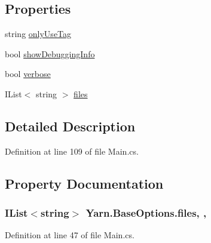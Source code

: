 \subsection*{Properties}
\begin{DoxyCompactItemize}
\item 
string \hyperlink{a00097_a8b30c1b7fb1b74eae455a568c1024b3d}{only\-Use\-Tag}
\item 
bool \hyperlink{a00031_a89964ea17bd19caf00cb5bff563ed01c}{show\-Debugging\-Info}
\item 
bool \hyperlink{a00031_ada4d83d1756918f362d55f6649b82b17}{verbose}
\item 
I\-List$<$ string $>$ \hyperlink{a00031_aa93cbb1bc1d5328e0a417012621e92d2}{files}
\end{DoxyCompactItemize}


\subsection{Detailed Description}


Definition at line 109 of file Main.\-cs.



\subsection{Property Documentation}
\hypertarget{a00031_aa93cbb1bc1d5328e0a417012621e92d2}{
\subsubsection[{files}]{\setlength{\rightskip}{0pt plus 5cm}I\-List$<$string$>$ Yarn.\-Base\-Options.\-files\hspace{0.3cm}{\ttfamily [get]}, {\ttfamily [set]}, {\ttfamily [inherited]}}}\label{a00031_aa93cbb1bc1d5328e0a417012621e92d2}


Definition at line 47 of file Main.\-cs.



